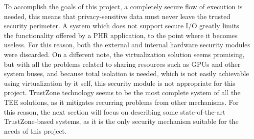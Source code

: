 To accomplish the goals of this project, a completely secure flow of execution is needed, this means that privacy-sensitive data must never leave the trusted security perimeter. A system which does not support secure I/O greatly limits the functionality offered by a \ac{PHR} application, to the point where it becomes useless. For this reason, both the external and internal hardware security modules were discarded. On a different note, the virtualization solution seems promising, but with all the problems related to sharing resources such as \ac{GPUs} and other system buses, and because total isolation is needed, which is not easily achievable using virtualization by it self, this security module is not appropriate for this project. TrustZone technology seems to be the most complete system of all the \ac{TEE} solutions, as it mitigates recurring problems from other mechanisms. For this reason, the next section will focus on describing some state-of-the-art TrustZone-based systems, as it is the only security mechanism suitable for the needs of this project.

